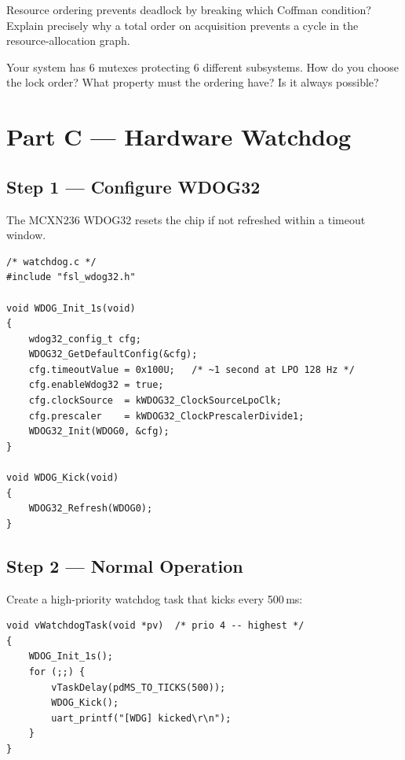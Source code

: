 \documentclass[11pt, a4paper]{article}
\begin{document}
\begin{questionbox}[~B1]
  Resource ordering prevents deadlock by breaking which Coffman condition? Explain
  precisely why a total order on acquisition prevents a cycle in the
  resource-allocation graph.
\end{questionbox}

\begin{questionbox}[~B2]
  Your system has 6 mutexes protecting 6 different subsystems. How do you choose the
  lock order? What property must the ordering have? Is it always possible?
\end{questionbox}

\section{Part C --- Hardware Watchdog}

\subsection{Step 1 --- Configure WDOG32}

The MCXN236 WDOG32 resets the chip if not refreshed within a timeout window.

\begin{lstlisting}[style=cstyle]
/* watchdog.c */
#include "fsl_wdog32.h"

void WDOG_Init_1s(void)
{
    wdog32_config_t cfg;
    WDOG32_GetDefaultConfig(&cfg);
    cfg.timeoutValue = 0x100U;   /* ~1 second at LPO 128 Hz */
    cfg.enableWdog32 = true;
    cfg.clockSource  = kWDOG32_ClockSourceLpoClk;
    cfg.prescaler    = kWDOG32_ClockPrescalerDivide1;
    WDOG32_Init(WDOG0, &cfg);
}

void WDOG_Kick(void)
{
    WDOG32_Refresh(WDOG0);
}
\end{lstlisting}

\subsection{Step 2 --- Normal Operation}

Create a high-priority watchdog task that kicks every 500\,ms:

\begin{lstlisting}[style=cstyle]
void vWatchdogTask(void *pv)  /* prio 4 -- highest */
{
    WDOG_Init_1s();
    for (;;) {
        vTaskDelay(pdMS_TO_TICKS(500));
        WDOG_Kick();
        uart_printf("[WDG] kicked\r\n");
    }
}
\end{lstlisting}
\end{document}
